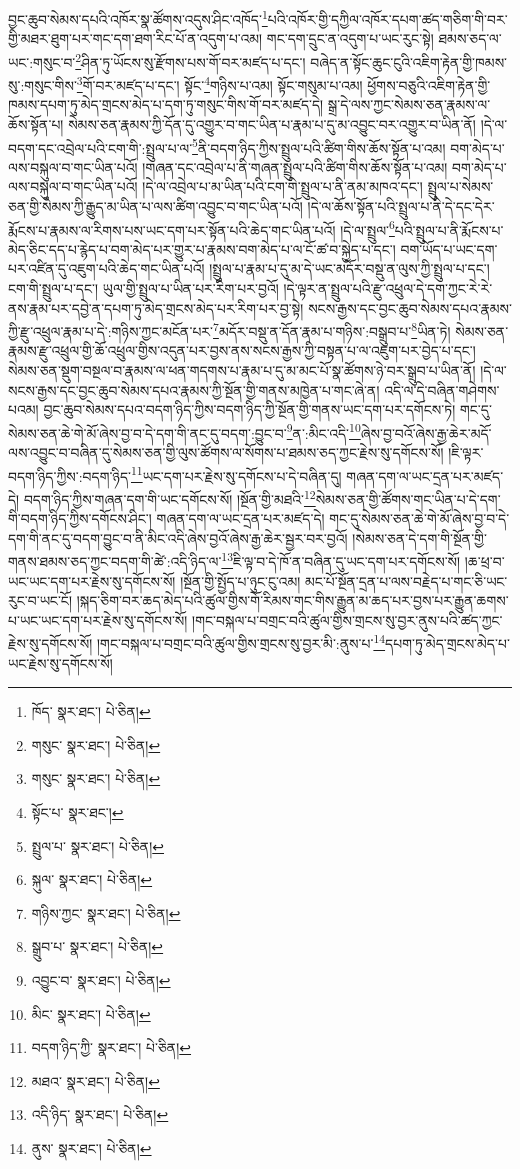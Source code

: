 བྱང་ཆུབ་སེམས་དཔའི་འཁོར་སྣ་ཚོགས་འདུས་ཤིང་འཁོད་\footnote{ཁོད་  སྣར་ཐང་།  པེ་ཅིན། }པའི་འཁོར་གྱི་དཀྱིལ་འཁོར་དཔག་ཚད་གཅིག་གི་བར་གྱི་མཐར་ཐུག་པར་གང་དག་ཐག་རིང་པོ་ན་འདུག་པ་འམ། གང་དག་དྲུང་ན་འདུག་པ་ཡང་རུང་སྟེ། ཐམས་ཅད་ལ་ཡང་:གསུང་བ་\footnote{གསུང་  སྣར་ཐང་།  པེ་ཅིན། }ཤིན་ཏུ་ཡོངས་སུ་རྫོགས་པས་གོ་བར་མཛད་པ་དང་། བཞེད་ན་སྟོང་ཆུང་ངུའི་འཇིག་རྟེན་གྱི་ཁམས་སུ་:གསུང་གིས་\footnote{གསུང་  སྣར་ཐང་།  པེ་ཅིན། }གོ་བར་མཛད་པ་དང་། སྟོང་\footnote{སྟོང་པ་  སྣར་ཐང་། }གཉིས་པ་འམ། སྟོང་གསུམ་པ་འམ། ཕྱོགས་བཅུའི་འཇིག་རྟེན་གྱི་ཁམས་དཔག་ཏུ་མེད་གྲངས་མེད་པ་དག་ཏུ་གསུང་གིས་གོ་བར་མཛད་དེ། སྒྲ་དེ་ལས་ཀྱང་སེམས་ཅན་རྣམས་ལ་ཆོས་སྟོན་པ། སེམས་ཅན་རྣམས་ཀྱི་དོན་དུ་འགྱུར་བ་གང་ཡིན་པ་རྣམ་པ་དུ་མ་འབྱུང་བར་འགྱུར་བ་ཡིན་ནོ། །དེ་ལ་བདག་དང་འབྲེལ་པའི་ངག་གི་:སྤྲུལ་པ་ལ་\footnote{སྤྲུལ་པ་  སྣར་ཐང་།  པེ་ཅིན། }ནི་བདག་ཉིད་ཀྱིས་སྤྲུལ་པའི་ཚིག་གིས་ཆོས་སྟོན་པ་འམ། བག་མེད་པ་ལས་བསྐུལ་བ་གང་ཡིན་པའོ། །གཞན་དང་འབྲེལ་པ་ནི་གཞན་སྤྲུལ་པའི་ཚིག་གིས་ཆོས་སྟོན་པ་འམ། བག་མེད་པ་ལས་བསྐུལ་བ་གང་ཡིན་པའོ། །དེ་ལ་འབྲེལ་པ་མ་ཡིན་པའི་ངག་གི་སྤྲུལ་པ་ནི་ནམ་མཁའ་དང་། སྤྲུལ་པ་སེམས་ཅན་གྱི་སེམས་ཀྱི་རྒྱུད་མ་ཡིན་པ་ལས་ཚིག་འབྱུང་བ་གང་ཡིན་པའོ། །དེ་ལ་ཆོས་སྟོན་པའི་སྤྲུལ་པ་ནི་དེ་དང་དེར་རྨོངས་པ་རྣམས་ལ་རིགས་པས་ཡང་དག་པར་སྟོན་པའི་ཆེད་གང་ཡིན་པའོ། །དེ་ལ་སྤྲུལ་\footnote{སྐུལ་  སྣར་ཐང་།  པེ་ཅིན། }པའི་སྤྲུལ་པ་ནི་རྨོངས་པ་མེད་ཅིང་དད་པ་རྙེད་པ་བག་མེད་པར་གྱུར་པ་རྣམས་བག་མེད་པ་ལ་ངོ་ཚ་བ་སྐྱེད་པ་དང་། བག་ཡོད་པ་ཡང་དག་པར་འཛིན་དུ་འཇུག་པའི་ཆེད་གང་ཡིན་པའོ། །སྤྲུལ་པ་རྣམ་པ་དུ་མ་དེ་ཡང་མདོར་བསྡུ་ན་ལུས་ཀྱི་སྤྲུལ་པ་དང་། ངག་གི་སྤྲུལ་པ་དང་། ཡུལ་གྱི་སྤྲུལ་པ་ཡིན་པར་རིག་པར་བྱའོ། །དེ་ལྟར་ན་སྤྲུལ་པའི་རྫུ་འཕྲུལ་དེ་དག་ཀྱང་རེ་རེ་ནས་རྣམ་པར་དབྱེ་ན་དཔག་ཏུ་མེད་གྲངས་མེད་པར་རིག་པར་བྱ་སྟེ། སངས་རྒྱས་དང་བྱང་ཆུབ་སེམས་དཔའ་རྣམས་ཀྱི་རྫུ་འཕྲུལ་རྣམ་པ་དེ་:གཉིས་ཀྱང་མངོན་པར་\footnote{གཉིས་ཀྱང་  སྣར་ཐང་།  པེ་ཅིན། }མདོར་བསྡུ་ན་དོན་རྣམ་པ་གཉིས་:བསྒྲུབ་པ་\footnote{སྒྲུབ་པ་  སྣར་ཐང་།  པེ་ཅིན། }ཡིན་ཏེ། སེམས་ཅན་རྣམས་རྫུ་འཕྲུལ་གྱི་ཆོ་འཕྲུལ་གྱིས་འདུན་པར་བྱས་ནས་སངས་རྒྱས་ཀྱི་བསྟན་པ་ལ་འཇུག་པར་བྱེད་པ་དང་། སེམས་ཅན་སྡུག་བསྔལ་བ་རྣམས་ལ་ཕན་གདགས་པ་རྣམ་པ་དུ་མ་མང་པོ་སྣ་ཚོགས་ཉེ་བར་སྒྲུབ་པ་ཡིན་ནོ། །དེ་ལ་སངས་རྒྱས་དང་བྱང་ཆུབ་སེམས་དཔའ་རྣམས་ཀྱི་སྔོན་གྱི་གནས་མཁྱེན་པ་གང་ཞེ་ན། འདི་ལ་དེ་བཞིན་གཤེགས་པའམ། བྱང་ཆུབ་སེམས་དཔའ་བདག་ཉིད་ཀྱིས་བདག་ཉིད་ཀྱི་སྔོན་གྱི་གནས་ཡང་དག་པར་དགོངས་ཏེ། གང་དུ་སེམས་ཅན་ཆེ་གེ་མོ་ཞེས་བྱ་བ་དེ་དག་གི་ནང་དུ་བདག་:བྱུང་བ་\footnote{འབྱུང་བ་  སྣར་ཐང་།  པེ་ཅིན། }ན་:མིང་འདི་\footnote{མིང་  སྣར་ཐང་།  པེ་ཅིན། }ཞེས་བྱ་བའོ་ཞེས་རྒྱ་ཆེར་མདོ་ལས་འབྱུང་བ་བཞིན་དུ་སེམས་ཅན་གྱི་ལུས་ཚོགས་ལ་སོགས་པ་ཐམས་ཅད་ཀྱང་རྗེས་སུ་དགོངས་སོ། །ཇི་ལྟར་བདག་ཉིད་ཀྱིས་:བདག་ཉིད་\footnote{བདག་ཉིད་ཀྱི་  སྣར་ཐང་།  པེ་ཅིན། }ཡང་དག་པར་རྗེས་སུ་དགོངས་པ་དེ་བཞིན་དུ། གཞན་དག་ལ་ཡང་དྲན་པར་མཛད་དེ། བདག་ཉིད་ཀྱིས་གཞན་དག་གི་ཡང་དགོངས་སོ། །སྔོན་གྱི་མཐའི་\footnote{མཐའ་  སྣར་ཐང་།  པེ་ཅིན། }སེམས་ཅན་གྱི་ཚོགས་གང་ཡིན་པ་དེ་དག་གི་བདག་ཉིད་ཀྱིས་དགོངས་ཤིང་། གཞན་དག་ལ་ཡང་དྲན་པར་མཛད་དེ། གང་དུ་སེམས་ཅན་ཆེ་གེ་མོ་ཞེས་བྱ་བ་དེ་དག་གི་ནང་དུ་བདག་བྱུང་བ་ནི་མིང་འདི་ཞེས་བྱའོ་ཞེས་རྒྱ་ཆེར་སྦྱར་བར་བྱའོ། །སེམས་ཅན་དེ་དག་གི་སྔོན་གྱི་གནས་ཐམས་ཅད་ཀྱང་བདག་གི་ཚེ་:འདི་ཉིད་ལ་\footnote{འདི་ཉིད་  སྣར་ཐང་།  པེ་ཅིན། }ཇི་ལྟ་བ་དེ་ཁོ་ན་བཞིན་དུ་ཡང་དག་པར་དགོངས་སོ། །ཆ་ཕྲ་བ་ཡང་ཡང་དག་པར་རྗེས་སུ་དགོངས་སོ། །སྔོན་གྱི་སྤྱོད་པ་ཉུང་ངུ་འམ། མང་པོ་སྔོན་དྲན་པ་ལས་བརྗེད་པ་གང་ཅི་ཡང་རུང་བ་ཡང་ངོ། །སྐད་ཅིག་བར་ཆད་མེད་པའི་ཚུལ་གྱིས་གོ་རིམས་གང་གིས་རྒྱུན་མ་ཆད་པར་བྱས་པར་རྒྱུན་ཆགས་པ་ཡང་ཡང་དག་པར་རྗེས་སུ་དགོངས་སོ། །གང་བསྐལ་པ་བགྲང་བའི་ཚུལ་གྱིས་གྲངས་སུ་བྱར་ནུས་པའི་ཚད་ཀྱང་རྗེས་སུ་དགོངས་སོ། །གང་བསྐལ་པ་བགྲང་བའི་ཚུལ་གྱིས་གྲངས་སུ་བྱར་མི་:ནུས་པ་\footnote{ནུས་  སྣར་ཐང་།  པེ་ཅིན། }དཔག་ཏུ་མེད་གྲངས་མེད་པ་ཡང་རྗེས་སུ་དགོངས་སོ། 